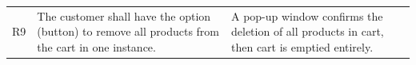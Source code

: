\documentclass[12pt]{article}
\begin{document}
\begin{myspace}{1.7}
\begin{table}[]
\begin{tabular}{| p{.5cm}|p{9cm} |p{5cm}|}
R9  & The customer shall have the option (button) to remove all products from the cart in one instance.                                                                                                                                                                                                      & A pop-up window confirms the deletion of all products in cart, then cart is emptied entirely.                                                                                                                                                                                \\
\end{tabular}
\end{table}
%
%


\end{myspace}
\end{document}
